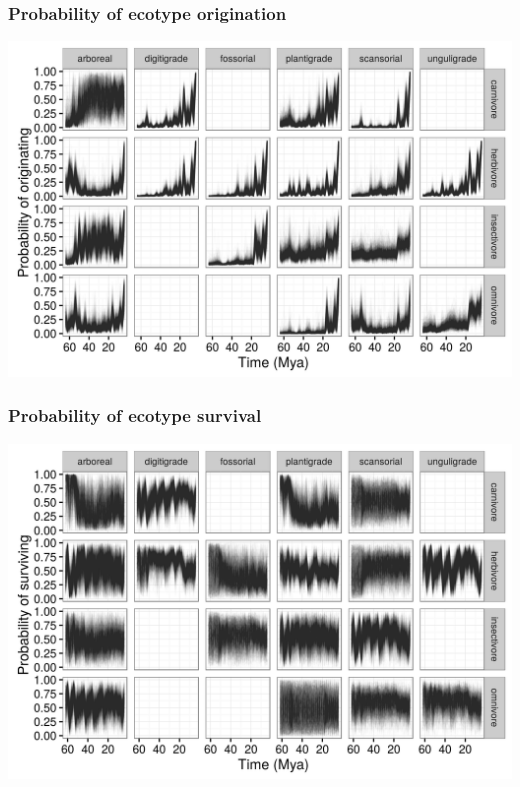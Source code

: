\documentclass{beamer}
\begin{document}
\begin{frame}
  \frametitle{Probability of ecotype origination}
  \begin{center}
    \includegraphics[height=0.8\textheight,width=\textwidth,keepaspectratio=true]{figure/ecotype_origin_bd}
  \end{center}
\end{frame}

\begin{frame}
  \frametitle{Probability of ecotype survival}
  \begin{center}
    \includegraphics[height=0.8\textheight,width=\textwidth,keepaspectratio=true]{figure/ecotype_survival_bd}
  \end{center}
\end{frame}
\end{document}
